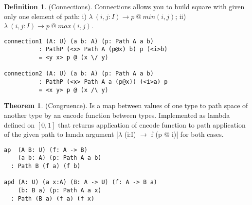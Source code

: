 \documentclass{article}
\theoremstyle{definition}
\newtheorem{theorem}{Theorem}
\newtheorem{definition}{Definition}
\begin{document}
\begin{definition} (Connections).
Connections allows you to build square
with given only one element of path: i) $\lambda\ (i,j: I) \rightarrow p\ @\ min(i,j)$;
ii) $\lambda\ (i,j:I) \rightarrow p\ @\ max(i,j)$.
\begin{center}
\end{center}
\begin{lstlisting}
connection1 (A: U) (a b: A) (p: Path A a b)
          : PathP (<x> Path A (p@x) b) p (<i>b)
          = <y x> p @ (x \/ y)

connection2 (A: U) (a b: A) (p: Path A a b)
          : PathP (<x> Path A a (p@x)) (<i>a) p
          = <x y> p @ (x /\ y)
\end{lstlisting}
\end{definition}

\begin{theorem} (Congruence).
Is a map between values of one type
to path space of another type by an encode function between types.
Implemented as lambda defined on $[0,1]$ that returns
application of encode function to path application of
the given path to lamda argument |$\lambda$ (i:I) $\rightarrow$ f (p @ i)|
for both cases.
\begin{lstlisting}
ap  (A B: U) (f: A -> B)
    (a b: A) (p: Path A a b)
  : Path B (f a) (f b)

apd (A: U) (a x:A) (B: A -> U) (f: A -> B a)
    (b: B a) (p: Path A a x)
  : Path (B a) (f a) (f x)
\end{lstlisting}
\end{theorem}
\end{document}
